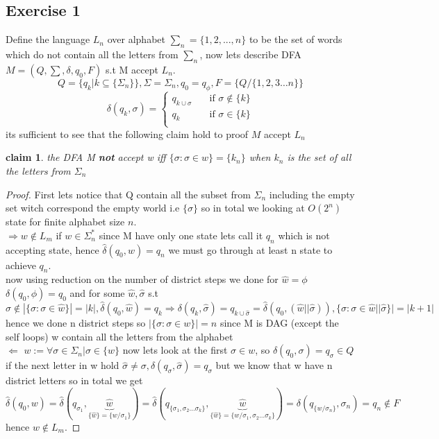 \documentclass[12pt]{article}
\newtheorem{claim}[theorem]{claim}
\begin{document}
\subsection{Exercise 1}
 Define the language $L_n$ over alphabet $\sum_n = \lbrace 1, 2, ..., n\rbrace$ to be the set of words
which do not contain all the letters from $\sum_n$, now lets describe DFA $M=(Q,\sum ,\delta,q_0,F)$ s.t M accept $L_n$.
 \[
Q=\lbrace q_k | k \subseteq \lbrace \Sigma_n \rbrace \rbrace,\Sigma =\Sigma_n,q_0={q_{\phi}},F=\lbrace Q/\lbrace 1,2,3\dots n \rbrace \rbrace
\]
\[
\delta(q_k,\sigma) = 
     \begin{cases} 
      q_{k\cup \sigma } &\quad\text{if } \sigma \not\in \lbrace k \rbrace\\
       q_k &\quad\text{if     } \sigma \in \lbrace k \rbrace \\
     \end{cases}     
\]
its sufficient to see that the following claim hold to proof $M$ accept $L_n$
\begin{claim}
the DFA M \textbf{not} accept w iff $\lbrace \sigma: \sigma \in w \rbrace =\lbrace k_n \rbrace$ when $k_n$ is the set of all the letters from $\Sigma_n$
\end{claim}
\begin{proof}
First lets notice that Q contain all the subset from $\Sigma_n$ including the empty set witch correspond the empty world i.e $\lbrace \sigma \rbrace$ so in total we looking at $O(2^n)$ state for finite alphabet size $n$.\\
$\Rightarrow w\notin L_m$ if $w\in \Sigma _n^*$ since M have only one  state  lets call it $q_n$ which is not accepting state, hence $\hat{\delta}(q_0,w)=q_n$ we must go through at least n state to achieve $q_n$.  \\now using reduction on the number of district steps we done for $\hat{w}=\phi$ $\delta(q_0,\phi)=q_0$ and for some $\hat{w},\hat{\sigma}$ s.t\[ \hat{\sigma}\notin|\lbrace \sigma :\sigma \in \hat{w}\rbrace |=|k| , \hat{\delta}(q_0,\hat{w})=q_{k}\Rightarrow \delta(q_k,\hat{\sigma})=q_{k\cup \hat{\sigma}}=\hat{\delta}(q_0,(\hat{w}||\hat{\sigma})), \lbrace \sigma :\sigma \in \hat{w}||\hat{\sigma}\rbrace |=|k+1| \]
 hence we done n district steps so $| \lbrace \sigma :\sigma \in w\rbrace|=n$
 since M is DAG (except the self loops) w contain all the letters from the alphabet\\
 $\Leftarrow$ $w:= \forall \sigma \in \Sigma_n   |\sigma \in \lbrace w \rbrace $ now lets look at the first $\sigma \in w$, so $\delta(q_0,\sigma)=q_{\sigma}\in Q$ if the next letter in w hold $\hat{\sigma}\neq \sigma ,\delta(q_{\sigma},\hat{\sigma})=q_{\sigma}$ but we know that w have n district letters so in total  we get
\[
\hat{\delta}(q_0,w)=\hat{\delta}(q_{\sigma_1},\underbrace{\hat{w}}_{\lbrace \hat{w} \rbrace=\lbrace w/ \sigma_1\rbrace })=\hat{\delta}(q_{\lbrace \sigma_1,\sigma_2\dots \sigma_k \rbrace},\underbrace{\hat{w}}_{\lbrace \hat{w} \rbrace=\lbrace w/ \sigma_1,\sigma_2\dots \sigma_k \rbrace })=\delta(q_{\lbrace w/ \sigma_n \rbrace},\sigma_n)=q_n \notin F
\]  
hence $w\notin L_m$.

\end{proof}
\end{document}
